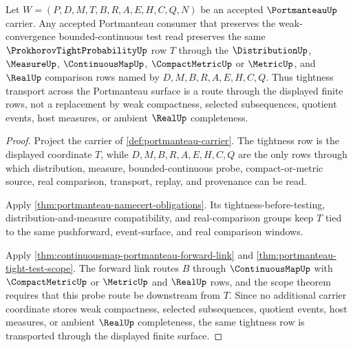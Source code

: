 \begin{theorem}
\label{thm:portmanteau-tightness-transport}
Let $W=(P,D,M,T,B,R,A,E,H,C,Q,N)$ be an accepted $\PortmanteauUp$ carrier. Any accepted Portmanteau consumer that preserves the weak-convergence bounded-continuous test read preserves the same $\ProkhorovTightProbabilityUp$ row $T$ through the $\DistributionUp$, $\MeasureUp$, $\ContinuousMapUp$, $\CompactMetricUp$ or $\MetricUp$, and $\RealUp$ comparison rows named by $D,M,B,R,A,E,H,C,Q$. Thus tightness transport across the Portmanteau surface is a route through the displayed finite rows, not a replacement by weak compactness, selected subsequences, quotient events, host measures, or ambient $\RealUp$ completeness.
\end{theorem}
\begin{proof}
Project the carrier of \autoref{def:portmanteau-carrier}. The tightness row is the displayed coordinate $T$, while $D,M,B,R,A,E,H,C,Q$ are the only rows through which distribution, measure, bounded-continuous probe, compact-or-metric source, real comparison, transport, replay, and provenance can be read.

Apply \autoref{thm:portmanteau-namecert-obligations}. Its tightness-before-testing, distribution-and-measure compatibility, and real-comparison groups keep $T$ tied to the same pushforward, event-surface, and real comparison windows.

Apply \autoref{thm:continuousmap-portmanteau-forward-link} and \autoref{thm:portmanteau-tight-test-scope}. The forward link routes $B$ through $\ContinuousMapUp$ with $\CompactMetricUp$ or $\MetricUp$ and $\RealUp$ rows, and the scope theorem requires that this probe route be downstream from $T$. Since no additional carrier coordinate stores weak compactness, selected subsequences, quotient events, host measures, or ambient $\RealUp$ completeness, the same tightness row is transported through the displayed finite surface.
\end{proof}

